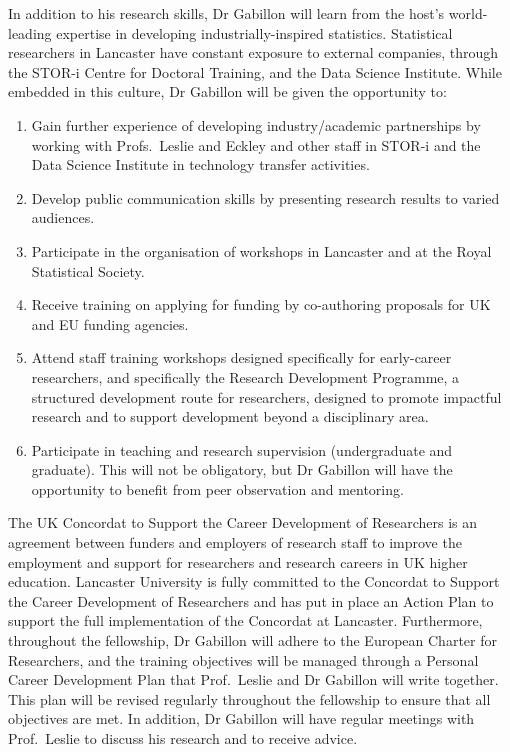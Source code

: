\documentclass[a4paper,11pt]{article}
\begin{document}
In addition to his research skills, Dr Gabillon will learn from the host's world-leading expertise in developing industrially-inspired statistics.  Statistical researchers in Lancaster have constant exposure to external companies, through the STOR-i Centre for Doctoral Training, and the Data Science Institute.  While embedded in this culture, Dr Gabillon will be given the opportunity to:
\begin{enumerate}
\item Gain further experience of developing industry/academic partnerships by working with Profs.\ Leslie and Eckley and other staff in STOR-i and the Data Science Institute in technology transfer activities.
\item Develop public communication skills by presenting research results to varied audiences.
\item Participate in the organisation of workshops in Lancaster and at the Royal Statistical Society.
\item Receive training on applying for funding by co-authoring proposals for UK and EU funding agencies.
\item Attend staff training workshops designed specifically for early-career researchers, and specifically the Research Development Programme, a structured development route for researchers, designed to promote impactful research and to support development beyond a disciplinary area.
\item Participate in teaching and research supervision (undergraduate and graduate).  This will not be obligatory, but Dr Gabillon will have the opportunity to benefit from peer observation and mentoring.\end{enumerate}

The UK Concordat to Support the Career Development of Researchers is an agreement between funders and employers of research staff to improve the employment and support for researchers and research careers in UK higher education.  Lancaster University is fully committed to the Concordat to Support the Career Development of Researchers and has put in place an Action Plan to support the full implementation of the Concordat at Lancaster.  Furthermore, throughout the fellowship, Dr Gabillon will adhere to the European Charter for Researchers, and the training objectives will be managed through a Personal Career Development Plan that Prof.\ Leslie and Dr Gabillon will write together.  This plan will be revised regularly throughout the fellowship to ensure that all objectives are met.  In addition, Dr Gabillon will have regular meetings with Prof.\ Leslie to discuss his research and to receive advice.
\end{document}
